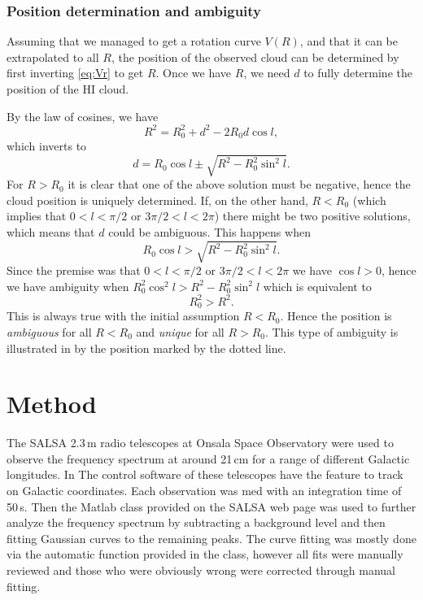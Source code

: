 \documentclass[11pt,a4paper, twocolumn,
swedish, english %
]{article}
\begin{document}
\subsubsection{Position determination and ambiguity}
Assuming that we managed to get a rotation curve $V(R)$, and that it
can be extrapolated to all $R$, the position of the observed cloud can
be determined by first inverting \eqref{eq:Vr} to get $R$. Once we
have $R$, we need $d$ to fully determine the position of the HI
cloud.

By the law of cosines, we have
\begin{equation}
R^2=R_0^2+d^2-2R_0d\cos l,
\end{equation}
which inverts to
\begin{equation}\label{eq:d}
d=R_0\cos l \pm\sqrt{R^2-R_0^2\sin^2l}.
\end{equation}
For $R>R_0$ it is clear that one of the above solution must be
negative, hence the cloud position is uniquely determined.
If, on the other hand, $R<R_0$ (which implies that $0<l<\pi/2$ or
$3\pi/2<l<2\pi$) there might be two positive solutions, which means
that $d$ could be ambiguous. This happens when 
\begin{equation}
R_0\cos l>\sqrt{R^2-R_0^2\sin^2l}.
\end{equation}
Since the premise was that $0<l<\pi/2$ or $3\pi/2<l<2\pi$ we have
$\cos l>0$, hence we have ambiguity when
$R_0^2\cos^2l>R^2-R_0^2\sin^2l$ which is equivalent to
\begin{equation}
R_0^2>R^2.
\end{equation}
This is always true with the initial assumption $R<R_0$. Hence the
position is \emph{ambiguous} for all $R<R_0$ and \emph{unique} for all
$R>R_0$. This type of ambiguity is illustrated in  by
the position marked by the dotted line.

\section{Method}
The SALSA 2.3\,m radio telescopes at Onsala Space Observatory were
used to observe the frequency spectrum at around 21\,cm for a range of
different Galactic longitudes. In The control software of these
telescopes have the feature to track on Galactic coordinates. Each
observation was med with an integration time of 50\,s. Then the Matlab
class provided on the SALSA web page\footnotemark{} was used to further
analyze the frequency spectrum by subtracting a background level and
then fitting Gaussian curves to the remaining peaks. The curve fitting
was mostly done via the automatic function provided in the class,
however all fits were manually reviewed and those who were obviously
wrong were corrected through manual fitting.
\end{document}
